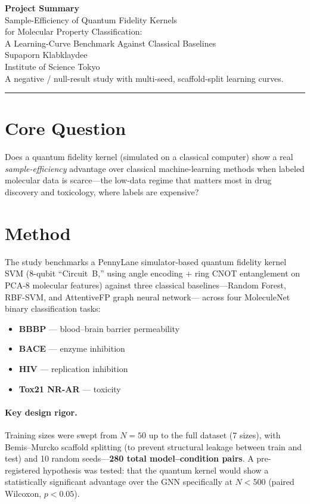 \documentclass[11pt,a4paper]{article}
\begin{document}
\begin{center}
  {\LARGE\bfseries Project Summary}\\[0.6em]
  {\large Sample-Efficiency of Quantum Fidelity Kernels\\
  for Molecular Property Classification:\\[0.25em]
  A Learning-Curve Benchmark Against Classical Baselines}\\[1em]
  {\normalsize Supaporn Klabklaydee}\\
  {\small Institute of Science Tokyo}\\[0.4em]
  {\footnotesize A negative / null-result study with multi-seed, scaffold-split learning curves.}
\end{center}

\vspace{0.6em}
\noindent\rule{\textwidth}{0.6pt}
\vspace{0.8em}

\section*{Core Question}
Does a quantum fidelity kernel (simulated on a classical computer) show a real \emph{sample-efficiency} advantage over classical machine-learning methods when labeled molecular data is scarce---the low-data regime that matters most in drug discovery and toxicology, where labels are expensive?

\section*{Method}
The study benchmarks a PennyLane simulator-based quantum fidelity kernel SVM
(8-qubit ``Circuit~B,'' using angle encoding + ring CNOT entanglement on PCA-8 molecular features)
against three classical baselines---Random Forest, RBF-SVM, and AttentiveFP graph neural network---
across four MoleculeNet binary classification tasks:
\begin{itemize}[leftmargin=1.4em,itemsep=0.2em]
  \item \textbf{BBBP} --- blood--brain barrier permeability
  \item \textbf{BACE} --- enzyme inhibition
  \item \textbf{HIV} --- replication inhibition
  \item \textbf{Tox21 NR-AR} --- toxicity
\end{itemize}

\paragraph{Key design rigor.}
Training sizes were swept from $N=50$ up to the full dataset (7 sizes),
with Bemis--Murcko scaffold splitting (to prevent structural leakage between train and test)
and 10 random seeds---\textbf{280 total model--condition pairs}.
A pre-registered hypothesis was tested: that the quantum kernel would show a statistically significant advantage over the GNN specifically at $N<500$ (paired Wilcoxon, $p<0.05$).
\end{document}
